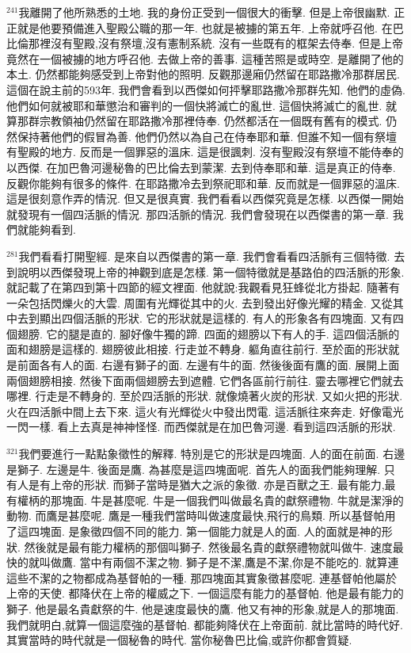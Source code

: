 \documentclass{book}
\begin{document}
$^{241}$我離開了他所熟悉的土地.
我的身份正受到一個很大的衝擊.
但是上帝很幽默.
正正就是他要預備進入聖殿公職的那一年.
也就是被擄的第五年.
上帝就呼召他.
在巴比倫那裡沒有聖殿,沒有祭壇,沒有憲制系統.
沒有一些既有的框架去侍奉.
但是上帝竟然在一個被擄的地方呼召他.
去做上帝的善事.
這種苦照是或時空.
是離開了他的本土.
仍然都能夠感受到上帝對他的照明.
反觀那邊廂仍然留在耶路撒冷那群居民.
這個在說主前的593年.
我們會看到以西傑如何抨擊耶路撒冷那群先知.
他們的虛偽.
他們如何就被耶和華懲治和審判的一個快將滅亡的亂世.
這個快將滅亡的亂世.
就算那群宗教領袖仍然留在耶路撒冷那裡侍奉.
仍然都活在一個既有舊有的模式.
仍然保持著他們的假冒為善.
他們仍然以為自己在侍奉耶和華.
但誰不知一個有祭壇有聖殿的地方.
反而是一個罪惡的溫床.
這是很諷刺.
沒有聖殿沒有祭壇不能侍奉的以西傑.
在加巴魯河邊秘魯的巴比倫去到蒙潔.
去到侍奉耶和華.
這是真正的侍奉.
反觀你能夠有很多的條件.
在耶路撒冷去到祭祀耶和華.
反而就是一個罪惡的溫床.
這是很刻意作弄的情況.
但又是很真實.
我們看看以西傑究竟是怎樣.
以西傑一開始就發現有一個四活脈的情況.
那四活脈的情況.
我們會發現在以西傑書的第一章.
我們就能夠看到.

$^{281}$我們看看打開聖經.
是來自以西傑書的第一章.
我們會看看四活脈有三個特徵.
去到說明以西傑發現上帝的神觀到底是怎樣.
第一個特徵就是基路伯的四活脈的形象.
就記載了在第四到第十四節的經文裡面.
他就說:我觀看見狂蜂從北方掛起.
隨著有一朵包括閃爍火的大雲.
周圍有光輝從其中的火.
去到發出好像光耀的精金.
又從其中去到顯出四個活脈的形狀.
它的形狀就是這樣的.
有人的形象各有四塊面.
又有四個翅膀.
它的腿是直的.
腳好像牛獨的蹄.
四面的翅膀以下有人的手.
這四個活脈的面和翅膀是這樣的.
翅膀彼此相接.
行走並不轉身.
軀角直往前行.
至於面的形狀就是前面各有人的面.
右邊有獅子的面.
左邊有牛的面.
然後後面有鷹的面.
展開上面兩個翅膀相接.
然後下面兩個翅膀去到遮體.
它們各區前行前往.
靈去哪裡它們就去哪裡.
行走是不轉身的.
至於四活脈的形狀.
就像燒著火炭的形狀.
又如火把的形狀.
火在四活脈中間上去下來.
這火有光輝從火中發出閃電.
這活脈往來奔走.
好像電光一閃一樣.
看上去真是神神怪怪.
而西傑就是在加巴魯河邊.
看到這四活脈的形狀.

$^{321}$我們要進行一點點象徵性的解釋.
特別是它的形狀是四塊面.
人的面在前面.
右邊是獅子.
左邊是牛.
後面是鷹.
為甚麼是這四塊面呢.
首先人的面我們能夠理解.
只有人是有上帝的形狀.
而獅子當時是猶大之派的象徵.
亦是百獸之王.
最有能力,最有權柄的那塊面.
牛是甚麼呢.
牛是一個我們叫做最名貴的獻祭禮物.
牛就是潔淨的動物.
而鷹是甚麼呢.
鷹是一種我們當時叫做速度最快,飛行的鳥類.
所以基督帕用了這四塊面.
是象徵四個不同的能力.
第一個能力就是人的面.
人的面就是神的形狀.
然後就是最有能力權柄的那個叫獅子.
然後最名貴的獻祭禮物就叫做牛.
速度最快的就叫做鷹.
當中有兩個不潔之物.
獅子是不潔,鷹是不潔,你是不能吃的.
就算連這些不潔的之物都成為基督帕的一種.
那四塊面其實象徵甚麼呢.
連基督帕他屬於上帝的天使.
都降伏在上帝的權威之下.
一個這麼有能力的基督帕.
他是最有能力的獅子.
他是最名貴獻祭的牛.
他是速度最快的鷹.
他又有神的形象,就是人的那塊面.
我們就明白,就算一個這麼強的基督帕.
都能夠降伏在上帝面前.
就比當時的時代好.
其實當時的時代就是一個秘魯的時代.
當你秘魯巴比倫,或許你都會質疑.
\end{document}
